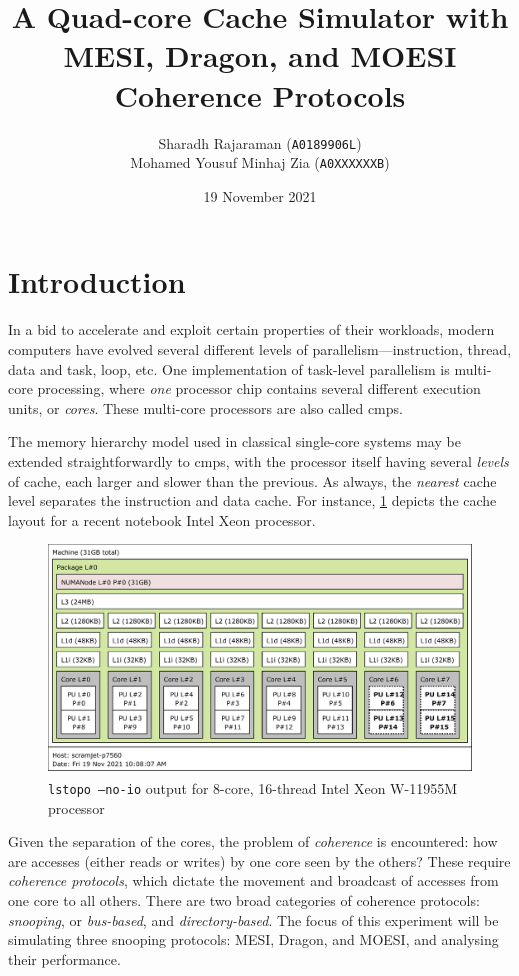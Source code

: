 \documentclass[date,tikzlibs,lmodern,10pt]{epreport}
\title{A Quad-core Cache Simulator with MESI, Dragon, and MOESI Coherence Protocols}
\author{Sharadh Rajaraman (\texttt{A0189906L}) \\ Mohamed Yousuf Minhaj Zia (\texttt{A0XXXXXXB})}
\date{19 November 2021}
\begin{document}
\maketitle

\tableofcontents

\section{Introduction}
In a bid to accelerate and exploit certain properties of their workloads, modern computers have evolved several different levels of parallelism---instruction, thread, data and task, loop, etc.
One implementation of task-level parallelism is multi-core processing, where \emph{one} processor chip contains several different execution units, or \emph{cores}.
These multi-core processors are also called \glspl{cmp}.

The memory hierarchy model used in classical single-core systems may be extended straightforwardly to \glspl{cmp}, with the processor itself having several \emph{levels} of cache, each larger and slower than the previous.
As always, the \emph{nearest} cache level separates the instruction and data cache.
For instance, \cref{fig:xeon-lstopo} depicts the cache layout for a recent notebook Intel Xeon processor.

\begin{figure}[htbp]
	\centering
	\includegraphics[width=0.8\columnwidth]{images/lstopo.pdf}
	\caption{\texttt{lstopo --no-io} output for 8-core, 16-thread Intel\textsuperscript\textregistered{} Xeon\textsuperscript\textregistered{} W-11955M processor}\label{fig:xeon-lstopo}
\end{figure}

Given the separation of the cores, the problem of \emph{coherence} is encountered: how are accesses (either reads or writes) by one core seen by the others?
These require \emph{coherence protocols}, which dictate the movement and broadcast of accesses from one core to all others.
There are two broad categories of coherence protocols: \emph{snooping}, or \emph{bus-based}, and \emph{directory-based}.
The focus of this experiment will be simulating three snooping protocols: MESI, Dragon, and MOESI, and analysing their performance.
\end{document}
